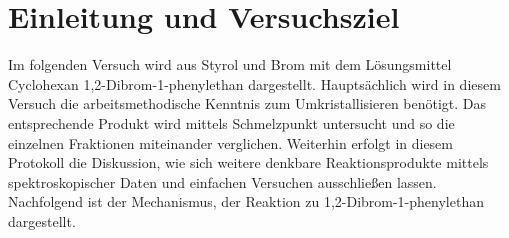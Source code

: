 \section{Einleitung und Versuchsziel}
\label{sec:aufgabenstellung}

Im folgenden Versuch wird aus Styrol und Brom mit dem Lösungsmittel Cyclohexan 1,2-Dibrom-1-phenylethan dargestellt. Hauptsächlich wird in diesem Versuch die arbeitsmethodische Kenntnis zum Umkristallisieren benötigt. Das entsprechende Produkt wird mittels Schmelzpunkt untersucht und so die einzelnen Fraktionen miteinander verglichen. Weiterhin erfolgt in diesem Protokoll die Diskussion, wie sich weitere denkbare Reaktionsprodukte mittels spektroskopischer Daten und einfachen Versuchen ausschließen lassen.\\
Nachfolgend ist der Mechanismus, der Reaktion zu 1,2-Dibrom-1-phenylethan dargestellt.

